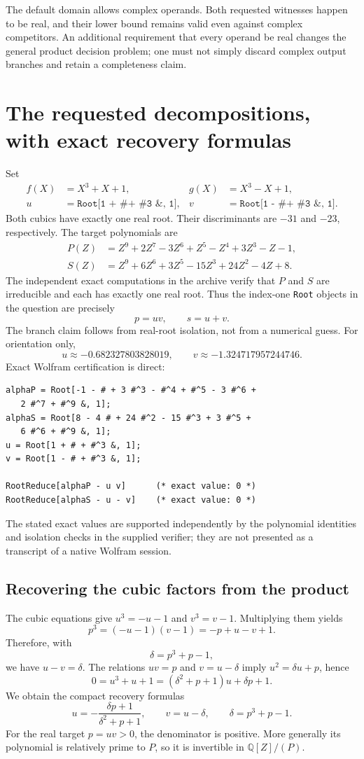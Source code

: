 \documentclass[11pt,a4paper]{article}
\theoremstyle{definition}\newtheorem{definition}[theorem]{Definition}
\theoremstyle{remark}\newtheorem{remark}[theorem]{Remark}
\newcommand{\Q}{\mathbb Q}\newcommand{\C}{\mathbb C}\newcommand{\Z}{\mathbb Z}
\newcommand{\wl}[1]{\texttt{#1}}
\begin{document}
The default domain allows complex operands. Both requested witnesses happen to be real, and their lower bound remains valid even against complex competitors. An additional requirement that every operand be real changes the general product decision problem; one must not simply discard complex output branches and retain a completeness claim.

\section{The requested decompositions, with exact recovery formulas}
\label{sec:examples}
Set
\begin{align*}
 f(X)&=X^3+X+1,& g(X)&=X^3-X+1,\\
 u&=\wl{Root[1 + \# + \#\^{}3 \&, 1]},&
 v&=\wl{Root[1 - \# + \#\^{}3 \&, 1]}.
\end{align*}
Both cubics have exactly one real root. Their discriminants are $-31$ and $-23$, respectively. The target polynomials are
\begin{align}
 P(Z)&=Z^9+2Z^7-3Z^6+Z^5-Z^4+3Z^3-Z-1,\label{eq:P}\\
 S(Z)&=Z^9+6Z^6+3Z^5-15Z^3+24Z^2-4Z+8.\label{eq:S}
\end{align}
The independent exact computations in the archive verify that $P$ and $S$ are irreducible and each has exactly one real root. Thus the index-one \wl{Root} objects in the question are precisely
\[
 p=uv,\qquad s=u+v.
\]
The branch claim follows from real-root isolation, not from a numerical guess. For orientation only,
\[
 u\approx-0.682327803828019,\qquad v\approx-1.324717957244746.
\]
Exact Wolfram certification is direct:
\begin{lstlisting}
alphaP = Root[-1 - # + 3 #^3 - #^4 + #^5 - 3 #^6 +
   2 #^7 + #^9 &, 1];
alphaS = Root[8 - 4 # + 24 #^2 - 15 #^3 + 3 #^5 +
   6 #^6 + #^9 &, 1];
u = Root[1 + # + #^3 &, 1];
v = Root[1 - # + #^3 &, 1];

RootReduce[alphaP - u v]      (* exact value: 0 *)
RootReduce[alphaS - u - v]    (* exact value: 0 *)
\end{lstlisting}
The stated exact values are supported independently by the polynomial identities and isolation checks in the supplied verifier; they are not presented as a transcript of a native Wolfram session.

\subsection{Recovering the cubic factors from the product}
The cubic equations give $u^3=-u-1$ and $v^3=v-1$. Multiplying them yields
\[
 p^3=(-u-1)(v-1)=-p+u-v+1.
\]
Therefore, with
\[
 \delta=p^3+p-1,
\]
we have $u-v=\delta$. The relations $uv=p$ and $v=u-\delta$ imply $u^2=\delta u+p$, hence
\[
 0=u^3+u+1=(\delta^2+p+1)u+\delta p+1.
\]
We obtain the compact recovery formulas
\begin{equation}
 \boxed{\quad u=-\frac{\delta p+1}{\delta^2+p+1},\qquad
 v=u-\delta,\qquad \delta=p^3+p-1.\quad}
 \label{eq:productrecovery}
\end{equation}
For the real target $p=uv>0$, the denominator is positive. More generally its polynomial is relatively prime to $P$, so it is invertible in $\Q[Z]/(P)$.
\end{document}
